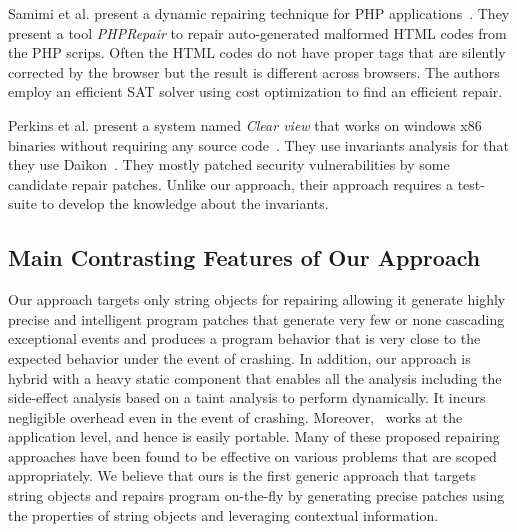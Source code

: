  Samimi et al. present a dynamic repairing
technique for PHP applications~\cite{SamirniSAMTH12}. They present a tool
\textit{PHPRepair} to repair auto-generated malformed HTML codes from the PHP
scrips. Often the HTML codes do not have proper tags that are silently
corrected by the browser but the result is different across browsers. The
authors employ an efficient SAT solver using cost optimization to find an
efficient repair.

 Perkins et al. present a system named
\emph{Clear view} that works on windows x86 binaries without requiring any
source code~\cite{conf/sosp/PerkinsKLABCPSSSWZER09}. They use invariants
analysis for that they use Daikon~\cite{DBLP:journals/scp/ErnstPGMPTX07}. They
mostly patched security vulnerabilities by some candidate repair patches. Unlike
our approach, their approach requires a test-suite to develop the knowledge
about the invariants.

\subsection{Main Contrasting Features of Our Approach}

Our approach targets only string objects for repairing allowing it generate
highly precise and intelligent program patches that generate very few or none
cascading exceptional events and produces a program behavior that is very close
to the expected behavior under the event of crashing. In addition, our approach
is hybrid with a heavy static component that enables all the analysis including
the side-effect analysis based on a taint analysis to perform dynamically. It
incurs negligible overhead even in the event of crashing. Moreover, \tool\ works
at the application level, and hence is easily portable. Many of these proposed
repairing approaches have been found to be effective on various problems that
are scoped appropriately. We believe that ours is the first generic approach
that targets string objects and repairs program on-the-fly by generating precise
patches using the properties of string objects and leveraging contextual
information.